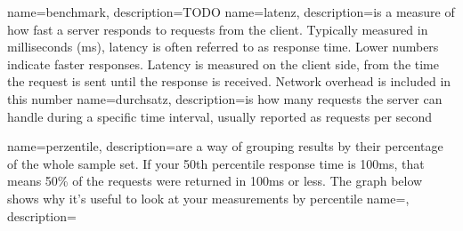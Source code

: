 {
    name=benchmark,
    description={TODO}
}
{
    name=latenz,
    description={is a measure of how fast a server responds to requests from the client. 
    Typically measured in milliseconds (ms), latency is often referred to as response time.
     Lower numbers indicate faster responses. Latency is measured on the client side, from the 
     time the request is sent until the response is received. Network overhead is included in this number}
}
{
    name=durchsatz,
    description={is how many requests the server can handle during a specific time interval, usually reported as requests per second}
}

{
    name=perzentile,
    description={are a way of grouping results by their percentage of the whole sample set. 
    If your 50th percentile response time is 100ms, that means 
    50\% of the requests were returned in 100ms or less. The graph below shows why it’s useful to look at your measurements by percentile}
}
{
    name=,
    description={}
}
